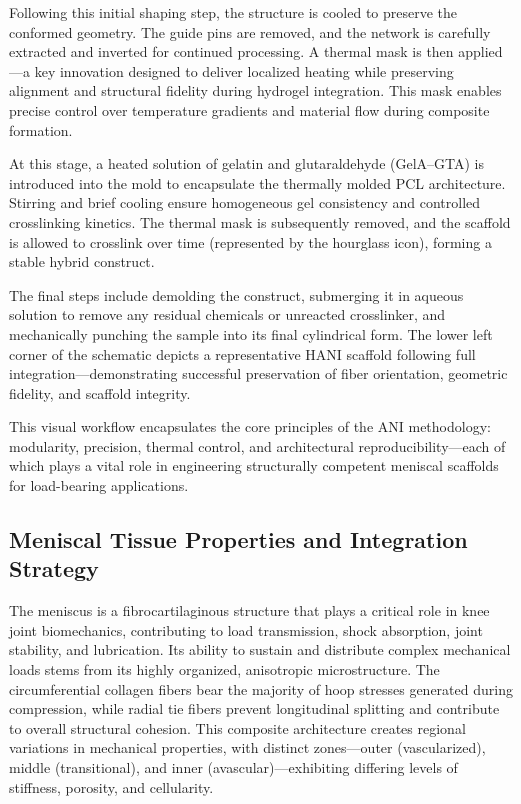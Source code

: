 Following this initial shaping step, the structure is cooled to preserve the conformed geometry. The guide pins are removed, and the network is carefully extracted and inverted for continued processing. A thermal mask is then applied—a key innovation designed to deliver localized heating while preserving alignment and structural fidelity during hydrogel integration. This mask enables precise control over temperature gradients and material flow during composite formation.

At this stage, a heated solution of gelatin and glutaraldehyde (GelA–GTA) is introduced into the mold to encapsulate the thermally molded PCL architecture. Stirring and brief cooling ensure homogeneous gel consistency and controlled crosslinking kinetics. The thermal mask is subsequently removed, and the scaffold is allowed to crosslink over time (represented by the hourglass icon), forming a stable hybrid construct.

The final steps include demolding the construct, submerging it in aqueous solution to remove any residual chemicals or unreacted crosslinker, and mechanically punching the sample into its final cylindrical form. The lower left corner of the schematic depicts a representative HANI scaffold following full integration—demonstrating successful preservation of fiber orientation, geometric fidelity, and scaffold integrity.

This visual workflow encapsulates the core principles of the ANI methodology: modularity, precision, thermal control, and architectural reproducibility—each of which plays a vital role in engineering structurally competent meniscal scaffolds for load-bearing applications.

\subsection{Meniscal Tissue Properties and Integration Strategy}

The meniscus is a fibrocartilaginous structure that plays a critical role in knee joint biomechanics, contributing to load transmission, shock absorption, joint stability, and lubrication. Its ability to sustain and distribute complex mechanical loads stems from its highly organized, anisotropic microstructure. The circumferential collagen fibers bear the majority of hoop stresses generated during compression, while radial tie fibers prevent longitudinal splitting and contribute to overall structural cohesion. This composite architecture creates regional variations in mechanical properties, with distinct zones—outer (vascularized), middle (transitional), and inner (avascular)—exhibiting differing levels of stiffness, porosity, and cellularity.

